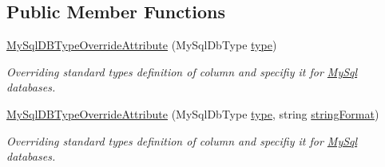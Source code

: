 \subsection*{Public Member Functions}
\begin{DoxyCompactItemize}
\item 
\mbox{\hyperlink{class_uniform_data_operator_1_1_sql_1_1_my_sql_1_1_markup_1_1_my_sql_d_b_type_override_attribute_aa74bbebc2d24175c5789db6c59994150}{My\+Sql\+D\+B\+Type\+Override\+Attribute}} (My\+Sql\+Db\+Type \mbox{\hyperlink{class_uniform_data_operator_1_1_sql_1_1_my_sql_1_1_markup_1_1_my_sql_d_b_type_override_attribute_ab2a4ea0d332bbef5fcda9c1be1a568c9}{type}})
\begin{DoxyCompactList}\small\item\em Overriding standard type\textquotesingle{}s definition of column and specifiy it for \mbox{\hyperlink{namespace_uniform_data_operator_1_1_sql_1_1_my_sql}{My\+Sql}} databases. \end{DoxyCompactList}\item 
\mbox{\hyperlink{class_uniform_data_operator_1_1_sql_1_1_my_sql_1_1_markup_1_1_my_sql_d_b_type_override_attribute_a192b467574dfb619a19417aafd5150cd}{My\+Sql\+D\+B\+Type\+Override\+Attribute}} (My\+Sql\+Db\+Type \mbox{\hyperlink{class_uniform_data_operator_1_1_sql_1_1_my_sql_1_1_markup_1_1_my_sql_d_b_type_override_attribute_ab2a4ea0d332bbef5fcda9c1be1a568c9}{type}}, string \mbox{\hyperlink{class_uniform_data_operator_1_1_sql_1_1_my_sql_1_1_markup_1_1_my_sql_d_b_type_override_attribute_a7410daaecf6cc40b01fd9ed17c0d02aa}{string\+Format}})
\begin{DoxyCompactList}\small\item\em Overriding standard type\textquotesingle{}s definition of column and specifiy it for \mbox{\hyperlink{namespace_uniform_data_operator_1_1_sql_1_1_my_sql}{My\+Sql}} databases. \end{DoxyCompactList}\end{DoxyCompactItemize}
